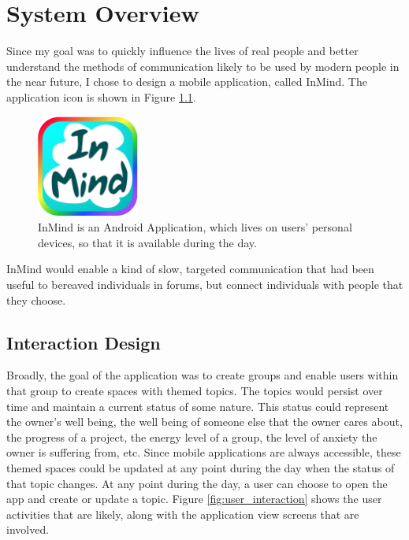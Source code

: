 \chapter{System Overview}
  Since my goal was to quickly influence the lives of real people
  and better understand the methods of communication likely to be used by
  modern people in the near future, I chose to design
  a mobile application, called InMind.
  The application icon is shown in Figure \ref{fig:application_icon}.

  \begin{figure}
  \centering
  \includegraphics[width=0.3\textwidth]{inmind_logo2.png}
  \caption[InMind icon]{InMind is an Android Application,
  which lives on users' personal devices,
  so that it is available during the day.}
  \label{fig:application_icon}
  \end{figure}

  InMind would enable a kind of slow,
  targeted communication that had been useful to bereaved individuals in forums,
  but connect individuals with people that they choose.

  \section{Interaction Design}
  Broadly, the goal of the application was to create groups and 
  enable users within that group to create spaces
  with themed topics.
  The topics would persist over time and maintain a current status of some nature.
  This status could represent the owner's well being, the well being of someone else
  that the owner cares about,
  the progress of a project, the energy level of a group,
  the level of anxiety the owner is suffering from, etc.
  Since mobile applications are always accessible,
  these themed spaces could be updated at any point
  during the day when the status of that topic changes.
  At any point during the day,
  a user can choose to open the app and create or update a topic.
  Figure \ref{fig:user_interaction} shows the user activities
  that are likely, along with the application view screens that are involved.
 
